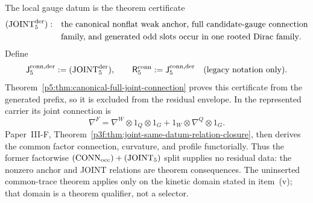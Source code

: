 \documentclass[12pt,a4paper]{article}
\begin{document}
\begin{definition}
The local gauge datum is the theorem certificate
\begin{equation}
\label{p5:eq:joint5-occ}
\begin{aligned}
({\rm JOINT}_5^{\rm der}):\quad
&\text{the canonical nonflat weak anchor, full candidate-gauge connection}\\
&\text{family, and generated odd slots occur in one rooted Dirac family}.
\end{aligned}
\end{equation}
Define
\[
 \mathsf J_5^{\rm conn,der}:=({\rm JOINT}_5^{\rm der}),
 \qquad
 \mathsf R_5^{\rm conn}:=\mathsf J_5^{\rm conn,der}
 \quad\text{(legacy notation only)}.
\]
Theorem~\ref{p5:thm:canonical-full-joint-connection} proves this certificate
from the generated prefix, so it is excluded from the residual envelope.  In the
represented carrier its joint connection is
\[
\nabla^F
=\nabla^W\otimes1_Q\otimes1_G
 +1_W\otimes\nabla^Q\otimes1_G .
\]
Paper~III-F, Theorem~\ref{p3f:thm:joint-same-datum-relation-closure}, then
derives the common factor connection, curvature, and profile functorially.
Thus the former
factorwise \(({\rm CONN}_{\rm occ})+({\rm JOINT}_5)\) split supplies no
residual data: the nonzero anchor and JOINT relations are theorem
consequences.  The uninserted common-trace
theorem applies only on the kinetic domain stated in item~(v); that domain is
a theorem qualifier, not a selector.


\end{definition}
\end{document}
